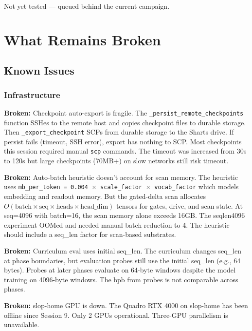 \documentclass[11pt,a4paper]{report}
\newcommand{\broken}[1]{\textcolor{broken}{\textbf{Broken:}} #1}
\begin{document}
Not yet tested --- queued behind the current campaign.


\part{What Remains Broken}
\label{part:broken}

\chapter{Known Issues}

\section{Infrastructure}

\broken{Checkpoint auto-export is fragile.} The \texttt{\_persist\_remote\_checkpoints} function SSHes to the remote host and copies checkpoint files to durable storage. Then \texttt{\_export\_checkpoint} SCPs from durable storage to the Sharts drive. If persist fails (timeout, SSH error), export has nothing to SCP. Most checkpoints this session required manual \texttt{scp} commands. The timeout was increased from 30s to 120s but large checkpoints (70MB+) on slow networks still risk timeout.

\broken{Auto-batch heuristic doesn't account for scan memory.} The heuristic uses \texttt{mb\_per\_token = 0.004 $\times$ scale\_factor $\times$ vocab\_factor} which models embedding and readout memory. But the gated-delta scan allocates $O(\text{batch} \times \text{seq} \times \text{heads} \times \text{head\_dim})$ tensors for gates, drive, and scan state. At seq=4096 with batch=16, the scan memory alone exceeds 16GB. The seqlen4096 experiment OOMed and needed manual batch reduction to 4. The heuristic should include a seq\_len factor for scan-based substrates.

\broken{Curriculum eval uses initial seq\_len.} The curriculum changes seq\_len at phase boundaries, but evaluation probes still use the initial seq\_len (e.g., 64 bytes). Probes at later phases evaluate on 64-byte windows despite the model training on 4096-byte windows. The bpb from probes is not comparable across phases.

\broken{slop-home GPU is down.} The Quadro RTX 4000 on slop-home has been offline since Session 9. Only 2 GPUs operational. Three-GPU parallelism is unavailable.
\end{document}
